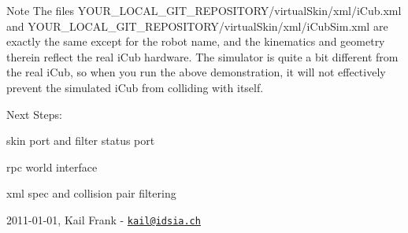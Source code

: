 \begin{DoxyNote}{Note}
The files {\ttfamily YOUR\_\-LOCAL\_\-GIT\_\-REPOSITORY/virtualSkin/xml/iCub.xml} and {\ttfamily YOUR\_\-LOCAL\_\-GIT\_\-REPOSITORY/virtualSkin/xml/iCubSim.xml} are exactly the same except for the robot name, and the kinematics and geometry therein reflect the real iCub hardware. The simulator is quite a bit different from the real iCub, so when you run the above demonstration, it will not effectively prevent the simulated iCub from colliding with itself.
\end{DoxyNote}
Next Steps:
\begin{DoxyItemize}
\item skin port and filter status port
\item rpc world interface
\item xml spec and collision pair filtering
\end{DoxyItemize}

2011-\/01-\/01, Kail Frank -\/ \href{mailto:kail@idsia.ch}{\tt kail@idsia.ch} 